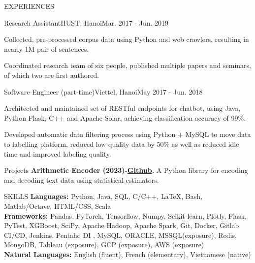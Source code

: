 \documentclass{resume} %
\begin{document}
\begin{rSection}{EXPERIENCES}
\begin{rWork}{Research Assistant}{HUST, Hanoi}{Mar. 2017 - Jun. 2019}
  \item Collected, pre-processed corpus data using Python and web crawlers, resulting in nearly 1M pair of sentences.
  \item Coordinated research team of six people, published multiple papers and seminars, of which two are first authored.
\end{rWork}
%
\begin{rWork}{Software Engineer (part-time)}{Viettel, Hanoi}{May 2017 - Jun. 2018}
  \item Architected and maintained set of RESTful endpoints for chatbot, using Java, Python Flask, C++ and Apache Solar, achieving classification accuracy of 99\%.
  \item Developed automatic data filtering process using Python + MySQL to move data to labelling platform, reduced low-quality data by 50\% as well as reduced idle time and improved labeling quality.
\end{rWork}
\end{rSection}
\begin{rSection}{Projects}
\textbf{Arithmetic Encoder (2023)-\href{https://github.com/HongHaiPV/ArithmeticEncoder}{Github}.} A Python library for encoding and decoding text data using statistical estimators.
\end{rSection}
\begin{rSection}{SKILLS}
\textbf{Languages:} Python, Java, SQL, C/C++, \LaTeX, Bash, Matlab/Octave, HTML/CSS, Scala\\
\textbf{Frameworks:} Pandas, PyTorch, Tensorflow, Numpy, Scikit-learn, Plotly, Flask, PyTest, XGBoost, SciPy, Apache Hadoop, Apache Spark, Git, Docker, Gitlab CI/CD, Jenkins, Pentaho DI , MySQL, ORACLE, MSSQL(exposure), Redis, MongoDB, Tableau (exposure), GCP (exposure), AWS (exposure)\\
\textbf{Natural Languages:} English (fluent), French (elementary), Vietnamese (native)\\
\end{rSection}
\end{document}

